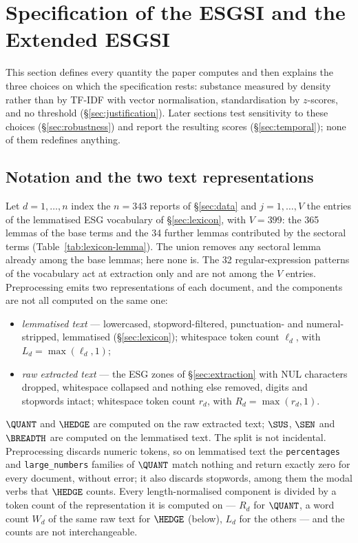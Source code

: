 \section{Specification of the ESGSI and the Extended ESGSI}
\label{sec:index}

This section defines every quantity the paper computes and then explains the
three choices on which the specification rests: substance measured by density
rather than by TF-IDF with vector normalisation, standardisation by $z$-scores,
and no threshold (\S\ref{sec:justification}). Later sections test sensitivity
to these choices (\S\ref{sec:robustness}) and report the resulting scores
(\S\ref{sec:temporal}); none of them redefines anything.

\subsection{Notation and the two text representations}
\label{sec:index-notation}

Let $d = 1,\dots,n$ index the $n = 343$ reports of \S\ref{sec:data} and $j = 1,\dots,V$
the entries of the lemmatised ESG vocabulary of \S\ref{sec:lexicon}, with
$V = 399$: the 365 lemmas of the base terms and the 34 further lemmas
contributed by the sectoral terms (Table~\ref{tab:lexicon-lemma}). The union
removes any sectoral lemma already among the base lemmas; here none is. The 32
regular-expression patterns of the vocabulary act at extraction only and
are not among the $V$ entries. Preprocessing emits two representations of each
document, and the components are not all computed on the same one:

\begin{itemize}
  \item \emph{lemmatised text} --- lowercased, stopword-filtered,
        punctuation- and numeral-stripped, lemmatised (\S\ref{sec:lexicon});
        whitespace token count $\ell_d$, with $L_d = \max(\ell_d, 1)$;
  \item \emph{raw extracted text} --- the ESG zones of \S\ref{sec:extraction}
        with NUL characters dropped, whitespace collapsed and nothing else
        removed, digits and stopwords intact; whitespace token count $r_d$, with
        $R_d = \max(r_d, 1)$.
\end{itemize}

$\QUANT$ and $\HEDGE$ are computed on the raw extracted text; $\SUS$, $\SEN$
and $\BREADTH$ are computed on the lemmatised text. The split is not
incidental. Preprocessing discards numeric tokens, so on lemmatised text the
\texttt{percentages} and \texttt{large\_numbers} families of $\QUANT$ match
nothing and return exactly zero for every document, without error; it also
discards stopwords, among them the modal verbs that $\HEDGE$ counts. Every
length-normalised component is divided by a token count of the
representation it is computed on --- $R_d$ for $\QUANT$, a word count $W_d$
of the same raw text for $\HEDGE$ (below), $L_d$ for the others --- and the
counts are not interchangeable.


